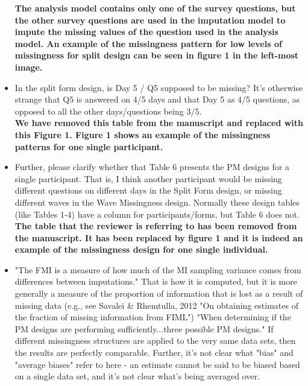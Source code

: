 \documentclass[letterpaper,12pt]{article}\usepackage[]{graphicx}\usepackage[]{color}
\begin{document}
\begin{itemize}
{\bf The analysis model contains only one of the survey questions, but the other survey questions are used in the imputation model to impute the missing values of the question used in the analysis model.  An example of the missingness pattern for low levels of missingness for split design can be seen in figure 1 in the left-most image.  }\\
 

\item In the split form design, is Day 5 / Q5 supposed to be missing? It's otherwise strange that Q5 is answered on 4/5 days and that Day 5 as 4/5 questions, as opposed to all the other days/questions being 3/5.\\

{\bf We have removed this table from the manuscript and replaced with this Figure 1.  Figure 1 shows an example of the missingness patterns for one single participant.  }\\

\item Further, please clarify whether that Table 6 presents the PM designs for a single participant. That is, I think another participant would be missing different questions on different days in the Split Form design, or missing different waves in the Wave Missingness design. Normally these design tables (like Tables 1-4) have a column for participants/forms, but Table 6 does not.\\

{\bf The table that the reviewer is referring to has been removed from the manuscript.  It has been replaced by figure 1 and it is indeed an example of the missingness design for one single individual.    }\\
  
\item "The FMI is a measure of how much of the MI sampling variance comes from differences between imputations." That is how it is computed, but it is more generally a measure of the proportion of information that is lost as a result of missing data (e.g., see Savalei & Rhemtulla, 2012 "On obtaining estimates of the fraction of missing information from FIML") "When determining if the PM designs are performing sufficiently...three possible PM designs." If different missingness structures are applied to the very same data sets, then the results are perfectly comparable. Further, it's not clear what "bias" and "average biases" refer to here - an estimate cannot be said to be biased based on a single data set, and it's not clear what's being averaged over.\\ 


\end{itemize}
\end{document}
